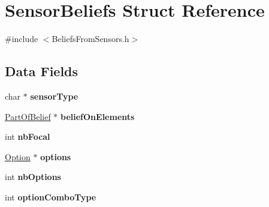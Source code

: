 \hypertarget{struct_sensor_beliefs}{
\section{SensorBeliefs Struct Reference}
\label{struct_sensor_beliefs}
}


{\ttfamily \#include $<$BeliefsFromSensors.h$>$}

\subsection*{Data Fields}
\begin{DoxyCompactItemize}
\item 
\hypertarget{struct_sensor_beliefs_a0e4608088550200592587c681b7a8f74}{
char $\ast$ {\bfseries sensorType}}
\label{struct_sensor_beliefs_a0e4608088550200592587c681b7a8f74}

\item 
\hypertarget{struct_sensor_beliefs_a18219016e640a65e9d6b960abefaf8d9}{
\hyperlink{struct_part_of_belief}{PartOfBelief} $\ast$ {\bfseries beliefOnElements}}
\label{struct_sensor_beliefs_a18219016e640a65e9d6b960abefaf8d9}

\item 
\hypertarget{struct_sensor_beliefs_af154415155c6b73acc53d18de0c615d9}{
int {\bfseries nbFocal}}
\label{struct_sensor_beliefs_af154415155c6b73acc53d18de0c615d9}

\item 
\hypertarget{struct_sensor_beliefs_a842b02964b6cd1b1d4037eddba13f5c8}{
\hyperlink{struct_option}{Option} $\ast$ {\bfseries options}}
\label{struct_sensor_beliefs_a842b02964b6cd1b1d4037eddba13f5c8}

\item 
\hypertarget{struct_sensor_beliefs_a8356fb2585c0c61557ab4dce52070743}{
int {\bfseries nbOptions}}
\label{struct_sensor_beliefs_a8356fb2585c0c61557ab4dce52070743}

\item 
\hypertarget{struct_sensor_beliefs_a07e6c8766d433c330358bfc76251ab29}{
int {\bfseries optionComboType}}
\label{struct_sensor_beliefs_a07e6c8766d433c330358bfc76251ab29}

\end{DoxyCompactItemize}


